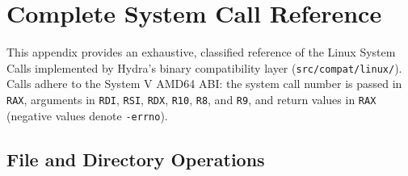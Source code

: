 \chapter{Complete System Call Reference}
\label{app:syscalls}

This appendix provides an exhaustive, classified reference of the Linux System Calls implemented by Hydra's binary compatibility layer (\texttt{src/compat/linux/}). Calls adhere to the System V AMD64 ABI: the system call number is passed in \texttt{RAX}, arguments in \texttt{RDI}, \texttt{RSI}, \texttt{RDX}, \texttt{R10}, \texttt{R8}, and \texttt{R9}, and return values in \texttt{RAX} (negative values denote \texttt{-errno}).

\section{File and Directory Operations}
\label{sec:ref_file_ops}

